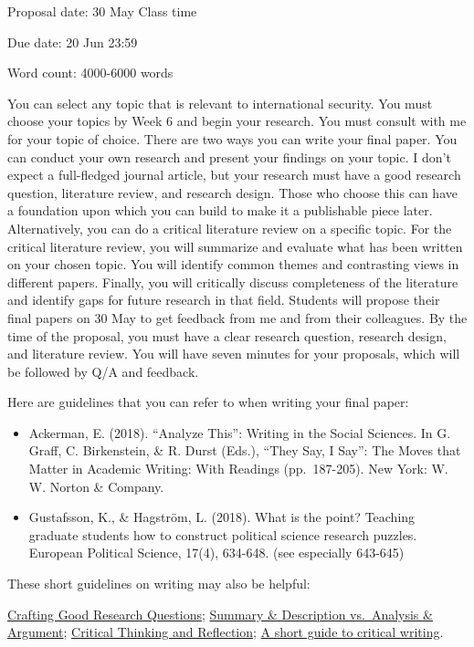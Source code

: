 \documentclass[
  letterpaper,
  DIV=11,
  numbers=noendperiod]{scrartcl}
\providecommand{\tightlist}{%
  \setlength{\itemsep}{0pt}\setlength{\parskip}{0pt}}\usepackage{longtable,booktabs,array}
\begin{document}
Proposal date: 30 May Class time

Due date: 20 Jun 23:59

Word count: 4000-6000 words

You can select any topic that is relevant to international security. You
must choose your topics by Week 6 and begin your research. You must
consult with me for your topic of choice. There are two ways you can
write your final paper. You can conduct your own research and present
your findings on your topic. I don't expect a full-fledged journal
article, but your research must have a good research question,
literature review, and research design. Those who choose this can have a
foundation upon which you can build to make it a publishable piece
later. Alternatively, you can do a critical literature review on a
specific topic. For the critical literature review, you will summarize
and evaluate what has been written on your chosen topic. You will
identify common themes and contrasting views in different papers.
Finally, you will critically discuss completeness of the literature and
identify gaps for future research in that field. Students will propose
their final papers on 30 May to get feedback from me and from their
colleagues. By the time of the proposal, you must have a clear research
question, research design, and literature review. You will have seven
minutes for your proposals, which will be followed by Q/A and feedback.

Here are guidelines that you can refer to when writing your final paper:

\begin{itemize}
\tightlist
\item
  Ackerman, E. (2018). ``Analyze This'': Writing in the Social Sciences.
  In G. Graff, C. Birkenstein, \& R. Durst (Eds.), ``They Say, I Say'':
  The Moves that Matter in Academic Writing: With Readings
  (pp.~187-205). New York: W. W. Norton \& Company.
\item
  Gustafsson, K., \& Hagström, L. (2018). What is the point? Teaching
  graduate students how to construct political science research puzzles.
  European Political Science, 17(4), 634-648. (see especially 643-645)
\end{itemize}

These short guidelines on writing may also be helpful:

\href{https://docs.google.com/spreadsheets/d/1TP7h17NHJFGCWGl67xF7rFJLcOpZg6pn5uSeZCVfLgA/edit\#gid=0}{Crafting
Good Research Questions};
\href{https://deanramser.files.wordpress.com/2017/01/1summaryvsanalysis_anthro.pdf}{Summary
\& Description vs.~Analysis \& Argument};
\href{https://www.nottingham.ac.uk/studentservices/documents/description-vs-analysis---learnhigher.pdf}{Critical
Thinking and Reflection};
\href{https://intranet.birmingham.ac.uk/as/libraryservices/library/asc/documents/public/pgtcriticalwriting.pdf}{A
short guide to critical writing}.
\end{document}
